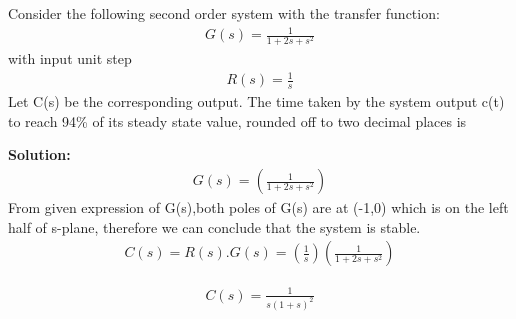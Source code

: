\item
%
Consider the following second order system with the transfer function:
\begin{multline}
G(s) = \frac{1}{1+2s+s^2}
\end{multline}
with input unit step 
\begin{multline}
R(s) = \frac{1}{s}
\end{multline}
 Let C(s) be the corresponding output. The time taken by the system output c(t) to reach 94\% of its steady state value, rounded off to two decimal places is



\textbf{Solution:}
\begin{multline}
G(s) = (\frac{1}{1+2s+s^2})
\end{multline}
From given expression of G(s),both poles of G(s) are at (-1,0) which is on the left half of s-plane, therefore we can conclude that the system is stable.
\begin{multline}
C(s) = R(s).G(s) = (\frac{1}{s})  (\frac{1}{1+2s+s^2})
\end{multline}

\begin{multline}
C(s) =  \frac{1}{s(1+s)^2}
\end{multline}

